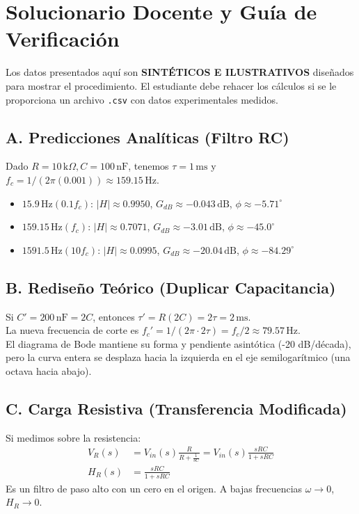 \documentclass[11pt, a4paper]{article}
\begin{document}
\section*{Solucionario Docente y Guía de Verificación}

\begin{tcolorbox}[colback=ucbblue!5, colframe=ucbblue, title=\textbf{Nota Exclusiva del Docente}]
Los datos presentados aquí son \textbf{SINTÉTICOS E ILUSTRATIVOS} diseñados para mostrar el procedimiento. El estudiante debe rehacer los cálculos si se le proporciona un archivo \texttt{.csv} con datos experimentales medidos.
\end{tcolorbox}

\subsection*{A. Predicciones Analíticas (Filtro RC)}
Dado $R=10\,\text{k}\Omega, C=100\,\text{nF}$, tenemos $\tau = 1\,\text{ms}$ y $f_c = 1/(2\pi(0.001)) \approx 159.15\,\text{Hz}$.
\begin{itemize}
    \item $15.9\,\text{Hz} (0.1 f_c)$: $|H| \approx 0.9950$, $G_{dB} \approx -0.043\,\text{dB}$, $\phi \approx -5.71^\circ$
    \item $159.15\,\text{Hz} (f_c)$: $|H| \approx 0.7071$, $G_{dB} \approx -3.01\,\text{dB}$, $\phi \approx -45.0^\circ$
    \item $1591.5\,\text{Hz} (10 f_c)$: $|H| \approx 0.0995$, $G_{dB} \approx -20.04\,\text{dB}$, $\phi \approx -84.29^\circ$
\end{itemize}

\subsection*{B. Rediseño Teórico (Duplicar Capacitancia)}
Si $C' = 200\,\text{nF} = 2C$, entonces $\tau' = R(2C) = 2\tau = 2\,\text{ms}$. \\
La nueva frecuencia de corte es $f_c' = 1 / (2\pi \cdot 2\tau) = f_c / 2 \approx 79.57\,\text{Hz}$. \\
El diagrama de Bode mantiene su forma y pendiente asintótica (-20 dB/década), pero la curva entera se desplaza hacia la izquierda en el eje semilogarítmico (una octava hacia abajo).

\subsection*{C. Carga Resistiva (Transferencia Modificada)}
Si medimos sobre la resistencia:
\begin{align*}
    V_R(s) &= V_{in}(s) \frac{R}{R + \frac{1}{sC}} = V_{in}(s) \frac{sRC}{1 + sRC} \\
    H_R(s) &= \frac{sRC}{1 + sRC}
\end{align*}
Es un filtro de paso alto con un cero en el origen. A bajas frecuencias $\omega \to 0$, $H_R \to 0$.
\end{document}
